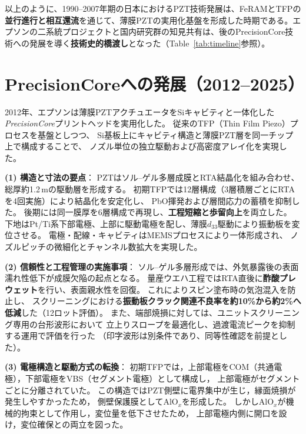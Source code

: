 \documentclass[conference]{IEEEtran}
\begin{document}
\medskip
以上のように、1990--2007年期の日本におけるPZT技術発展は、FeRAMとTFPの\textbf{並行進行と相互還流}を通じて、薄膜PZTの実用化基盤を形成した時期である。エプソンの二系統プロジェクトと国内研究群の知見共有は、後のPrecisionCore技術への発展を導く\textbf{技術史的橋渡し}となった（Table~\ref{tab:timeline}参照）。

\section{PrecisionCoreへの発展（2012--2025）}
2012年、エプソンは薄膜PZTアクチュエータをSiキャビティと一体化した
\textit{PrecisionCore}プリントヘッドを実用化した\cite{uemura2014mems}。
従来のTFP（Thin Film Piezo）プロセスを基盤としつつ、
Si基板上にキャビティ構造と薄膜PZT層を同一チップ上で構成することで、
ノズル単位の独立駆動および高密度アレイ化を実現した。

\medskip
\noindent
\textbf{(1) 構造と寸法の要点}：
PZTはソル--ゲル多層成膜とRTA結晶化を組み合わせ、
総厚約1.2\,\textmu mの駆動層を形成する。
初期TFPでは12層構成（3層積層ごとにRTAを4回実施）により結晶化を安定化し、
PbO揮発および層間応力の蓄積を抑制した。
後期には同一膜厚を6層構成で再現し、\textbf{工程短縮と歩留向上}を両立した。
下地はPt/Ti系下部電極、上部に駆動電極を配し、薄膜$d_{33}$駆動により振動板を変位させる。
電極・配線・キャビティはMEMSプロセスにより一体形成され、
ノズルピッチの微細化とチャンネル数拡大を実現した\cite{uemura2014mems,epson_wp_precisioncore}。

\medskip
\noindent
\textbf{(2) 信頼性と工程管理の実施事項}：
ソル--ゲル多層形成では、外気暴露後の表面濡れ性低下が成膜欠陥の起点となる。
量産ウエハ工程ではRTA直後に\textbf{酢酸プレウェット}を行い、表面親水性を回復。
これによりスピン塗布時の気泡混入を防止し、
スクリーニングにおける\textbf{振動板クラック関連不良率を約10\%から約2\%へ低減}した（12ロット評価）。
また、端部焼損に対しては、ユニットスクリーニング専用の台形波形において
立上りスロープを最適化し、過渡電流ピークを抑制する運用で評価を行った
（印字波形は別条件であり、同等性確認を前提とした）。

\medskip
\noindent
\textbf{(3) 電極構造と駆動方式の転換}：
初期TFPでは，上部電極をCOM（共通電極），下部電極をVBS（セグメント電極）として構成し，
上部電極がセグメントごとに分離されていた。
この構造ではPZT側壁に電界集中が生じ，縁面焼損が発生しやすかったため，
側壁保護膜としてAlO$_x$を形成した。
しかしAlO$_x$が機械的拘束として作用し，変位量を低下させたため，
上部電極内側に開口を設け，変位確保との両立を図った。
\end{document}
